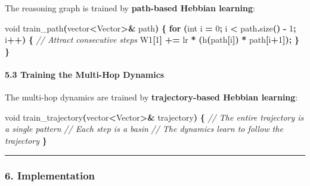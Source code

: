 \documentclass[
  11pt,
  a4paper,
]{article}
\newenvironment{Shaded}{\begin{snugshade}}{\end{snugshade}}
\newcommand{\CommentTok}[1]{\textcolor[rgb]{0.56,0.35,0.01}{\textit{#1}}}
\newcommand{\ControlFlowTok}[1]{\textcolor[rgb]{0.13,0.29,0.53}{\textbf{#1}}}
\newcommand{\DataTypeTok}[1]{\textcolor[rgb]{0.13,0.29,0.53}{#1}}
\newcommand{\DecValTok}[1]{\textcolor[rgb]{0.00,0.00,0.81}{#1}}
\newcommand{\NormalTok}[1]{#1}
\newcommand{\OperatorTok}[1]{\textcolor[rgb]{0.81,0.36,0.00}{\textbf{#1}}}
\begin{document}
The reasoning graph is trained by \textbf{path-based Hebbian learning}:

\begin{Shaded}
\begin{Highlighting}[]
\DataTypeTok{void}\NormalTok{ train\_path}\OperatorTok{(}\NormalTok{vector}\OperatorTok{\textless{}}\NormalTok{Vector}\OperatorTok{\textgreater{}\&}\NormalTok{ path}\OperatorTok{)} \OperatorTok{\{}
    \ControlFlowTok{for} \OperatorTok{(}\DataTypeTok{int}\NormalTok{ i }\OperatorTok{=} \DecValTok{0}\OperatorTok{;}\NormalTok{ i }\OperatorTok{\textless{}}\NormalTok{ path}\OperatorTok{.}\NormalTok{size}\OperatorTok{()} \OperatorTok{{-}} \DecValTok{1}\OperatorTok{;}\NormalTok{ i}\OperatorTok{++)} \OperatorTok{\{}
        \CommentTok{// Attract consecutive steps}
\NormalTok{        W1}\OperatorTok{[}\DecValTok{1}\OperatorTok{]} \OperatorTok{+=}\NormalTok{ lr }\OperatorTok{*} \OperatorTok{(}\NormalTok{h}\OperatorTok{(}\NormalTok{path}\OperatorTok{[}\NormalTok{i}\OperatorTok{])} \OperatorTok{*}\NormalTok{ path}\OperatorTok{[}\NormalTok{i}\OperatorTok{+}\DecValTok{1}\OperatorTok{]);}
    \OperatorTok{\}}
\OperatorTok{\}}
\end{Highlighting}
\end{Shaded}

\paragraph{5.3 Training the Multi-Hop
Dynamics}\label{training-the-multi-hop-dynamics}

The multi-hop dynamics are trained by \textbf{trajectory-based Hebbian
learning}:

\begin{Shaded}
\begin{Highlighting}[]
\DataTypeTok{void}\NormalTok{ train\_trajectory}\OperatorTok{(}\NormalTok{vector}\OperatorTok{\textless{}}\NormalTok{Vector}\OperatorTok{\textgreater{}\&}\NormalTok{ trajectory}\OperatorTok{)} \OperatorTok{\{}
    \CommentTok{// The entire trajectory is a single pattern}
    \CommentTok{// Each step is a basin}
    \CommentTok{// The dynamics learn to follow the trajectory}
\OperatorTok{\}}
\end{Highlighting}
\end{Shaded}

\begin{center}\rule{0.5\linewidth}{0.5pt}\end{center}

\subsubsection{6. Implementation}\label{implementation-4}
\end{document}
